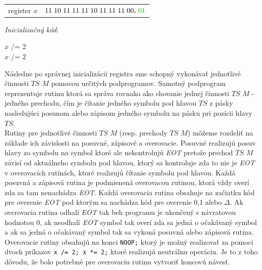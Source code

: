 \documentclass[11pt,a4paper]{article}
\newcommand{\red}[1]{\textcolor{red}{#1}}
\newcommand{\green}[1]{\textcolor{OliveGreen}{#1}}
\begin{document}
\begin{center}
    \begin{tabular}{r | l}
        register $x$ & $11 \hspace{1mm} 10 \hspace{1mm} 11 \hspace{1mm} 11 \hspace{1mm} 11 \hspace{1mm} 10 \hspace{1mm} 11 \hspace{1mm} 11 \hspace{1mm} 11 \hspace{1mm} 00 \red{\textbf{.}} \hspace{1mm} \green{01} $
    \end{tabular}
\end{center}

\newpage

\textit{Inicializačný kód}:
\begin{flushright}
\begin{minipage}{0.90\textwidth}
    $x \texttt{ /= } 2$\\
    $x \texttt{ /= } 2$\\
\end{minipage}
\end{flushright}

Následne po správnej inicializácii registra sme schopný vykonávať jednotlivé činnosti $TS$ $M$ pomocou určitých podprogramov. Samotný podprogram reprezentuje rutinu ktorá sa správa rovnako ako chovanie jednej činnosti $TS$ $M$ - jedného prechodu, čím je čítanie jedného symbolu pod hlavou $TS$ z pásky nasledujúci posunom alebo zápisom jedného symbolu na pásku pri pozícii hlavy $TS$.\\

Rutiny pre jednotlivé činnosti $TS$ $M$ (resp. prechody $TS$ $M$) môžeme rozdeliť na základe ich závislosti na posuvné, zápisové a overovacie. Posuvné realizujú posuv hlavy zo symbolu na symbol ktoré ale nekontrolujú \green{\textit{EOT}} pretože prechod $TS$ $M$ závisí od aktuálneho symbolu pod hlavou, ktorý sa kontroluje zda to nie je \green{\textit{EOT}} v overovacích rutinách, ktoré realizujú čítanie symbolu pod hlavou. Každá posuvná a zápisová rutina je podmienená overovacou rutinou, ktorá vždy overí zda sa tam nenachádza \green{\textit{EOT}}. Každá overovacia rutina obsahuje na začiatku kód pre overenie \green{\textit{EOT}} pod ktorým sa nachádza kód pre overenie $0$,$1$ alebo $\Delta$. Ak overovacia rutina odhalí \green{\textit{EOT}} tak beh programu je ukončený s návratovou hodnotou $0$, ak neodhalí \green{\textit{EOT}} symbol tak overí zda sa jedná o očakávaný symbol a ak sa jedná o očakávaný symbol tak sa vykoná posuvná alebo zápisová rutina. Overovacie rutiny obsahujú na konci \texttt{NOOP;} ktorý je možný realizovať za pomoci dvoch príkazov \texttt{x /= 2; x *= 2;} ktoré realizujú neutrálnu operáciu. Je to z toho dôvodu, že bolo potrebné pre overovaciu rutinu vytvoriť koncovú návesť.\\
\end{document}
